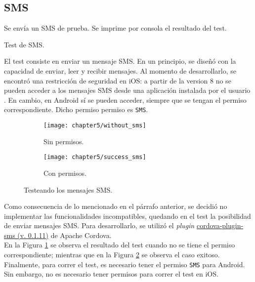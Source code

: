 \subsection{SMS}
\begin{algorithm}
	\begin{algorithmic}[1]
		\STATE Se envía un SMS de prueba.
		\STATE Se imprime por consola el resultado del test.
	\end{algorithmic}
	\caption{Test de SMS.}
	\label{alg:chap5_test_sms}
\end{algorithm}
El test consiste en enviar un mensaje SMS. En un principio, se diseñó con la capacidad de enviar, leer y recibir mensajes. Al momento de desarrollarlo, se encontró una restricción de seguridad en iOS: a partir de la version 8 no se pueden acceder a los mensajes SMS desde una aplicación instalada por el usuario \cite{foda, foda2}. En cambio, en Android sí se pueden acceder, siempre que se tengan el permiso correspondiente. Dicho permiso permiso es \texttt{SMS}.\\
\begin{figure}[hbp]
    \centering
	\begin{subfigure}{.28\linewidth}
		\texttt{[image: chapter5/without\_sms]}
		\caption{Sin permisos.}
		\label{fig:ch05:without_sms}
	\end{subfigure}
	\begin{subfigure}{.28\linewidth}
	    \centering
		\texttt{[image: chapter5/success\_sms]}
		\caption{Con permisos.}
		\label{fig:ch05:with_sms}
	\end{subfigure}
	\caption{Testeando los mensajes SMS.}
	\label{fig:chapter05:sms_test}
\end{figure}

Como consecuencia de lo mencionado en el párrafo anterior, se decidió no implementar las funcionalidades incompatibles, quedando en el test la posibilidad de enviar mensajes SMS. Para desarrollarlo, se utilizó el \textit{plugin} \href{https://github.com/floatinghotpot/cordova-plugin-sms}{cordova-plugin-sms (v. 0.1.11)} de Apache Cordova.\\

En la Figura \ref{fig:ch05:without_sms} se observa el resultado del test cuando no se tiene el permiso correspondiente; mientras que en la Figura \ref{fig:ch05:with_sms} se observa el caso exitoso.\\
Finalmente, para correr el test, es necesario tener el permiso \texttt{SMS} para Android. Sin embargo, no es necesario tener permisos para correr el test en iOS.
